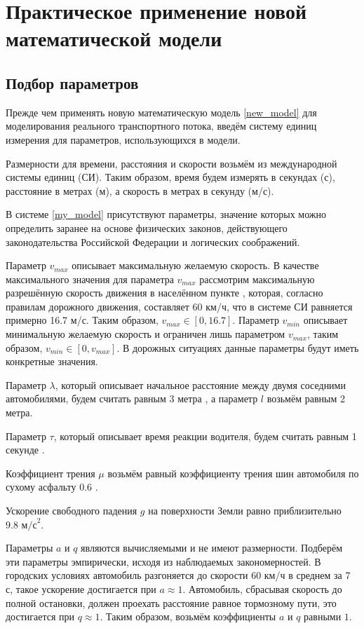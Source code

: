 \documentclass[12pt, a4paper]{extarticle}
\numberwithin{equation}{section}
\numberwithin{figure}{section}
\begin{document}
\section{Практическое применение новой математической модели} 

\subsection{Подбор параметров} 

Прежде чем применять новую математическую модель \eqref{new_model} для моделирования реального транспортного потока, введём систему единиц измерения для параметров, использующихся в модели.

Размерности для времени, расстояния и скорости возьмём из международной системы единиц (СИ). Таким образом, время будем измерять в секундах (с), расстояние в метрах (м), а скорость в метрах в секунду (м/с).

В системе \eqref{my_model} присутствуют параметры, значение которых можно определить заранее на основе физических законов, действующего законодательства Российской Федерации и логических соображений.

Параметр $v_{max}$ описывает максимальную желаемую скорость. В качестве максимального значения для параметра $v_{max}$ рассмотрим максимальную разрешённую скорость движения в населённом пункте \cite{PDD}, которая, согласно правилам дорожного движения, составляет 60 км/ч, что в системе СИ равняется примерно 16.7 м/с. Таким образом, $v_{max} \in [0,16.7]$. Параметр $v_{min}$ описывает минимальную желаемую скорость и ограничен лишь параметром $v_{max}$, таким образом, $v_{min} \in [0,v_{max}]$. В дорожных ситуациях данные параметры будут иметь конкретные значения.

Параметр $\lambda$, который описывает начальное расстояние между двумя соседними автомобилями, будем считать равным 3 метра \cite{PDD}, а параметр $l$ возьмём равным 2 метра.

Параметр $\tau$, который описывает время реакции водителя, будем считать равным 1 секунде \cite{PDD}.

Коэффициент трения $\mu$ возьмём равный коэффициенту трения шин автомобиля по сухому асфальту $0.6$ \cite{Physics}.

Ускорение свободного падения $g$ на поверхности Земли равно приблизительно $9.8 \text{ м/с}^2$.

Параметры $a$ и $q$ являются вычисляемыми и не имеют размерности. Подберём эти параметры эмпирически, исходя из наблюдаемых закономерностей. В городских условиях автомобиль разгоняется до скорости 60 км/ч в среднем за 7 с, такое ускорение достигается при $a\approx1$. Автомобиль, сбрасывая скорость до полной остановки, должен проехать расстояние равное тормозному пути, это достигается при $q\approx1$. Таким образом, возьмём коэффициенты $a$ и $q$ равными $1$.
\end{document}
